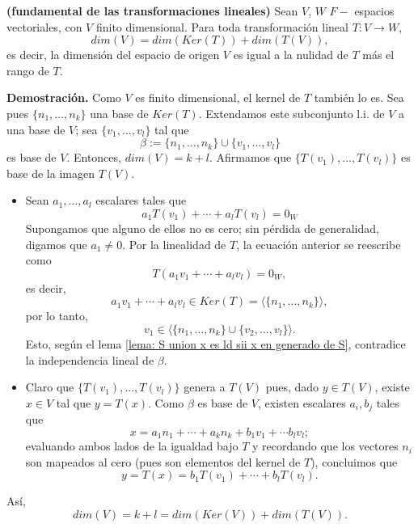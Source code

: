 \begin{teo}
	\label{teo: fundamental de las transf lineales}
\textbf{(fundamental de las transformaciones lineales)}
Sean $V$, $W$ $F-$ espacios vectoriales, con $V$
finito dimensional.
Para toda
transformación lineal $T: V \longrightarrow W$,
\begin{equation}
	\label{eq: dim de V es nulidad mas rango}
	dim(V) = dim(Ker(T)) + dim(T(V)),
\end{equation}
es decir, la dimensión del espacio de origen $V$
es igual a la nulidad de $T$ más el rango de $T$.
\end{teo}
\noindent
\textbf{Demostración.}
Como $V$ es finito dimensional, el kernel de $T$ también lo es.
Sea pues $\{ n_{1}, \ldots, n_{k} \}$ una base de $Ker(T)$.
Extendamos este subconjunto l.i. de $V$ a una base de $V$;
sea $\{ v_{1}, \ldots , v_{l} \}$ tal que 
\[
\beta :=
\{ n_{1}, \ldots , n_{k} \} \cup \{ v_{1}, \ldots , v_{l} \}
\]
es base de $V$. Entonces, $dim(V) = k+l$.
Afirmamos que 
$\{ T(v_{1}), \ldots, T(v_{l}) \}$
es base de la imagen $T(V)$.
\begin{itemize}
	\item Sean $a_{1}, \ldots, a_{l}$ escalares tales que
	\[
	a_{1} T(v_{1}) + \cdots + a_{l} T(v_{l}) = 0_{W}
	\]
	Supongamos que alguno de ellos no es cero; sin pérdida de
	generalidad, digamos que $a_{1} \neq 0$. Por la linealidad
	de $T$, la ecuación anterior se reescribe como
	\[
	T(a_{1}v_{1} + \cdots + a_{l}v_{l}) = 0_{W},
	\]
	es decir,
	\[
	a_{1}v_{1} + \cdots + a_{l}v_{l} \in Ker(T)
	= \langle \{ n_{1}, \ldots , n_{k} \} \rangle,
	\]
	por lo tanto, 
	\[
	v_{1} \in \langle \{ n_{1}, \ldots , n_{k} \}
	\cup \{ v_{2}, \ldots , v_{l} \} \rangle.
	\]
	Esto, según el lema 
	\ref{lema: S union x es ld sii x en generado de S}, contradice
	la independencia lineal de $\beta$.
	\item Claro que $\{ T(v_{1}), \ldots, T(v_{l}) \}$
	genera a $T(V)$ pues, dado $y \in T(V)$, existe 
	$x \in V$ tal que $y = T(x)$. Como $\beta$ es base de $V$,
	existen escalares $a_{i}, b_{j}$ tales que 
	\[
	x = a_{1} n_{1} + \cdots + a_{k} n_{k} + 
	b_{1}v_{1} + \cdots b_{l}v_{l};
	\]
	evaluando ambos lados de la igualdad bajo $T$ y recordando
	que los vectores $n_{i}$ son mapeados al cero (pues 
	son elementos del kernel de $T$), concluimos que
	\[
	y = T(x) = b_{1}T(v_{1}) + \cdots + b_{l}T(v_{l}).
	\]
\end{itemize}
Así, 
\[
dim(V) = k + l = dim(Ker(V)) + dim(T(V)).
\] 
\QEDB
\vspace{0.2cm}

